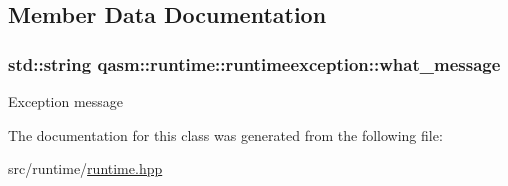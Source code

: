 \subsection{Member Data Documentation}
\subsubsection[{\texorpdfstring{what\+\_\+message}{what_message}}]{\setlength{\rightskip}{0pt plus 5cm}std\+::string qasm\+::runtime\+::runtimeexception\+::what\+\_\+message\hspace{0.3cm}{\ttfamily [private]}}\hypertarget{classqasm_1_1runtime_1_1runtimeexception_a4dbe6aefd35b6c30b9ccf89a7ccaacf9}{}\label{classqasm_1_1runtime_1_1runtimeexception_a4dbe6aefd35b6c30b9ccf89a7ccaacf9}
Exception message 

The documentation for this class was generated from the following file\+:\begin{DoxyCompactItemize}
\item 
src/runtime/\hyperlink{runtime_8hpp}{runtime.\+hpp}\end{DoxyCompactItemize}
